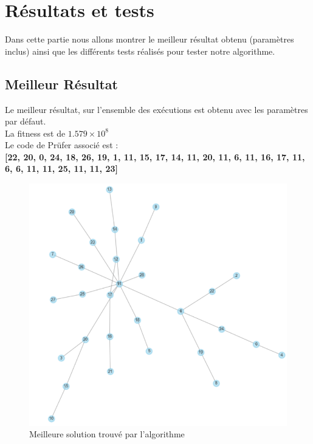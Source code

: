 \documentclass{article} %
\begin{document}
\section{Résultats et tests}
Dans cette partie nous allons montrer le meilleur résultat obtenu (paramètres inclus) ainsi que les différents tests réalisés pour tester notre algorithme.

\subsection{Meilleur Résultat}
Le meilleur résultat, sur l'ensemble des exécutions est obtenu avec les paramètres par défaut.\\
La fitness est de $1.579\times 10^8$\\
Le code de Prüfer associé est : \\\textbf{[22, 20, 0, 24, 18, 26, 19, 1, 11, 15, 17, 14, 11, 20, 11, 6, 11, 16, 17, 11, 6, 6, 11, 11, 25, 11, 11, 23]}
\begin{figure}[!h]
	\centering
	\includegraphics[keepaspectratio = true,scale=1]{thesol.png}
	\caption{Meilleure solution trouvé par l'algorithme}
\end{figure}
\end{document}
